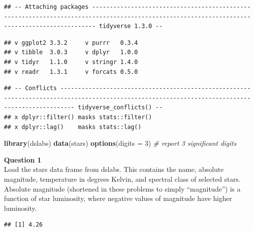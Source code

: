 \documentclass[
]{article}
\newenvironment{Shaded}{\begin{snugshade}}{\end{snugshade}}
\newcommand{\CommentTok}[1]{\textcolor[rgb]{0.56,0.35,0.01}{\textit{#1}}}
\newcommand{\DataTypeTok}[1]{\textcolor[rgb]{0.13,0.29,0.53}{#1}}
\newcommand{\DecValTok}[1]{\textcolor[rgb]{0.00,0.00,0.81}{#1}}
\newcommand{\KeywordTok}[1]{\textcolor[rgb]{0.13,0.29,0.53}{\textbf{#1}}}
\newcommand{\NormalTok}[1]{#1}
\newcommand{\OperatorTok}[1]{\textcolor[rgb]{0.81,0.36,0.00}{\textbf{#1}}}
\begin{document}
\begin{verbatim}
## -- Attaching packages --------------------------------------------------------------------------------------------------------------------------------------------- tidyverse 1.3.0 --
\end{verbatim}

\begin{verbatim}
## v ggplot2 3.3.2     v purrr   0.3.4
## v tibble  3.0.3     v dplyr   1.0.0
## v tidyr   1.1.0     v stringr 1.4.0
## v readr   1.3.1     v forcats 0.5.0
\end{verbatim}

\begin{verbatim}
## -- Conflicts ------------------------------------------------------------------------------------------------------------------------------------------------ tidyverse_conflicts() --
## x dplyr::filter() masks stats::filter()
## x dplyr::lag()    masks stats::lag()
\end{verbatim}

\begin{Shaded}
\begin{Highlighting}[]
\KeywordTok{library}\NormalTok{(dslabs)}
\KeywordTok{data}\NormalTok{(stars)}
\KeywordTok{options}\NormalTok{(}\DataTypeTok{digits =} \DecValTok{3}\NormalTok{)   }\CommentTok{# report 3 significant digits}
\end{Highlighting}
\end{Shaded}

\textbf{Question 1}\\
Load the stars data frame from dslabs. This contains the name, absolute
magnitude, temperature in degrees Kelvin, and spectral class of selected
stars. Absolute magnitude (shortened in these problems to simply
``magnitude'') is a function of star luminosity, where negative values
of magnitude have higher luminosity.

\begin{Shaded}
\end{Shaded}

\begin{verbatim}
## [1] 4.26
\end{verbatim}

\begin{Shaded}
\end{Shaded}
\end{document}
